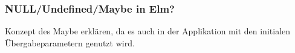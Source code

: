 \subsubsection{NULL/Undefined/Maybe in Elm?}
\label{sec:elm-undefined-null-maybe}
Konzept des Maybe erklären, da es auch in der Applikation mit den initialen Übergabeparametern genutzt wird.